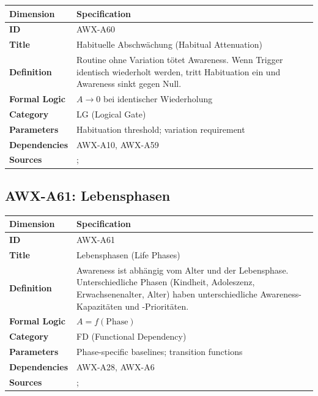 \begin{table}[htbp]
\small
\begin{tabular}{p{3cm}p{11cm}}
\toprule
\textbf{Dimension} & \textbf{Specification} \\
\midrule
\textbf{ID} & AWX-A60 \\
\textbf{Title} & Habituelle Abschwächung (Habitual Attenuation) \\
\textbf{Definition} & Routine ohne Variation tötet Awareness. Wenn Trigger identisch wiederholt werden, tritt Habituation ein und Awareness sinkt gegen Null. \\
\textbf{Formal Logic} & $A \rightarrow 0$ bei identischer Wiederholung \\
\textbf{Category} & LG (Logical Gate) \\
\textbf{Parameters} & Habituation threshold; variation requirement \\
\textbf{Dependencies} & AWX-A10, AWX-A59 \\
\textbf{Sources} & \citet{wood2016psychology}; \citet{rankin2009habituation} \\
\bottomrule
\end{tabular}
\end{table}


\subsection{AWX-A61: Lebensphasen}

\begin{table}[htbp]
\small
\begin{tabular}{p{3cm}p{11cm}}
\toprule
\textbf{Dimension} & \textbf{Specification} \\
\midrule
\textbf{ID} & AWX-A61 \\
\textbf{Title} & Lebensphasen (Life Phases) \\
\textbf{Definition} & Awareness ist abhängig vom Alter und der Lebensphase. Unterschiedliche Phasen (Kindheit, Adoleszenz, Erwachsenenalter, Alter) haben unterschiedliche Awareness-Kapazitäten und -Prioritäten. \\
\textbf{Formal Logic} & $A = f(\text{Phase})$ \\
\textbf{Category} & FD (Functional Dependency) \\
\textbf{Parameters} & Phase-specific baselines; transition functions \\
\textbf{Dependencies} & AWX-A28, AWX-A6 \\
\textbf{Sources} & \citet{carstensen1999taking}; \citet{heckman2006effects} \\
\bottomrule
\end{tabular}
\end{table}


